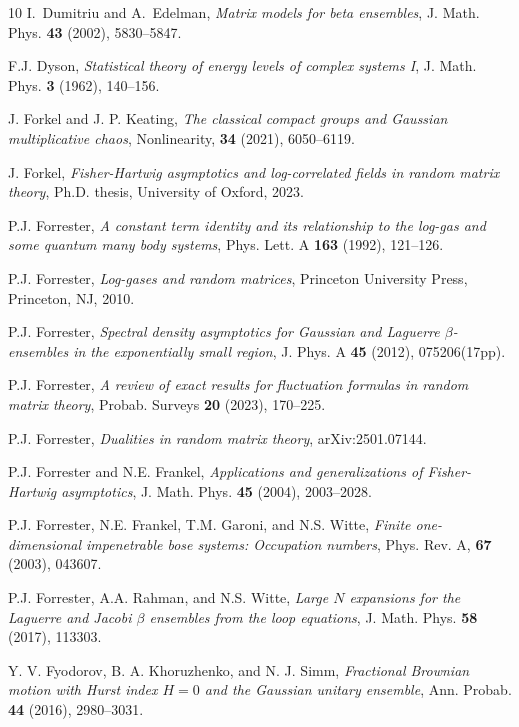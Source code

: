 \documentclass[11pt,a4paper]{article}
\numberwithin{equation}{section} %
\theoremstyle{plain}
\theoremstyle{definition}
\numberwithin{prop}{section}
\numberwithin{cor}{section}
\numberwithin{remark}{section}
\begin{document}
\begin{thebibliography}{10}
I.~Dumitriu and A.~Edelman, \emph{Matrix models for beta ensembles}, J. Math.
  Phys. \textbf{43} (2002), 5830--5847.
  
F.J. Dyson, \emph{Statistical theory of energy levels of complex systems {I}}, J.
  Math. Phys. \textbf{3} (1962), 140--156.
  
  J. Forkel and J. P. Keating, \emph{The classical compact groups and Gaussian multiplicative chaos}, Nonlinearity, \textbf{34}
(2021), 6050--6119.

  J. Forkel, \emph{Fisher-Hartwig asymptotics and log-correlated fields in random matrix theory}, Ph.D. thesis, University of Oxford,
  2023.
  
P.J. Forrester,   
  \emph{A constant term identity and its relationship to the log-gas and
  some quantum many body systems}, Phys. Lett. A \textbf{163} (1992), 121--126.
  
P.J. Forrester, \emph{Log-gases and random matrices}, Princeton University Press,
  Princeton, NJ, 2010.


P.J. Forrester, \emph{Spectral density asymptotics for {G}aussian and {L}aguerre
  $\beta$-ensembles in the exponentially small region}, J. Phys. A \textbf{45}
  (2012), 075206(17pp).

P.J. Forrester, \emph{A review of exact results for fluctuation formulas in random matrix theory},
Probab. Surveys \textbf{20} (2023), 170--225. 

  
P.J. Forrester, \emph{Dualities in random matrix theory},  arXiv:2501.07144.   

 P.J. Forrester and N.E. Frankel,  \emph{Applications and
generalizations of Fisher-Hartwig asymptotics}, J. Math. Phys. \textbf{45} (2004),
2003--2028.


P.J. Forrester, N.E. Frankel, T.M. Garoni, and N.S. Witte, \emph{Finite one-dimensional impenetrable
bose systems: Occupation numbers}, Phys. Rev. A, \textbf{67} (2003), 043607.

P.J. Forrester, A.A. Rahman, and N.S. Witte, \emph{Large $N$ expansions for the Laguerre and Jacobi $\beta$ ensembles from the loop equations}, J. Math. Phys. \textbf{58}
  (2017), 113303.

Y. V. Fyodorov, B. A. Khoruzhenko, and N. J. Simm,  \emph{Fractional Brownian motion with
Hurst index $H = 0$ and the Gaussian unitary ensemble}, Ann. Probab.  \textbf{44} (2016), 2980--3031.





\end{thebibliography}
\end{document}

